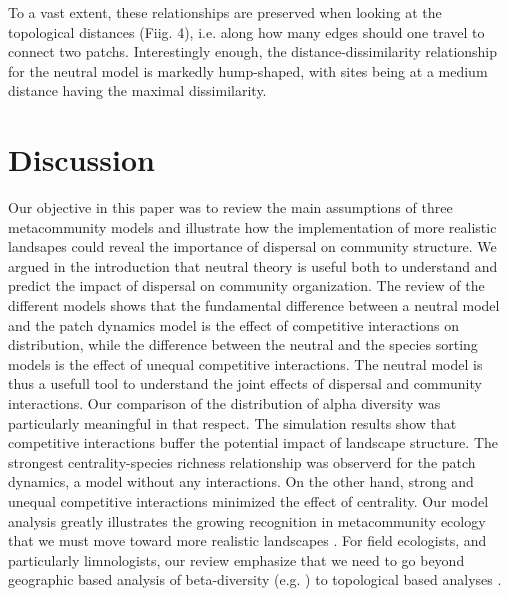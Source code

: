 \documentclass[12pt]{article}
\begin{document}
To a vast extent, these relationships are preserved when looking at the
topological distances (Fiig. 4), i.e. along how many edges should one travel to
connect two patchs. Interestingly enough, the distance-dissimilarity
relationship for the neutral model is markedly hump-shaped, with sites being at
a medium distance having the maximal dissimilarity.

\section{Discussion}

Our objective in this paper was to review the main assumptions of three
metacommunity models and illustrate how the implementation of more realistic
landsapes could reveal the importance of dispersal on community structure. We
argued in the introduction that neutral theory is useful both to understand and
predict the impact of dispersal on community organization. The review of the
different models shows that the fundamental difference between a neutral model
and the patch dynamics model is the effect of competitive interactions on
distribution, while the difference between the neutral and the species sorting
models is the effect of unequal competitive interactions. The neutral model is
thus a usefull tool to understand the joint effects of dispersal and community
interactions. Our comparison of the distribution of alpha diversity was
particularly meaningful in that respect. The simulation results show that
competitive interactions buffer the potential impact of landscape structure. The
strongest centrality-species richness relationship was observerd for the patch
dynamics, a model without any interactions. On the other hand, strong and
unequal competitive interactions minimized the effect of centrality. Our model
analysis greatly illustrates the growing recognition in metacommunity ecology
that we must move toward more realistic landscapes \parencite{Gilarranz2012}.
For field ecologists, and particularly limnologists, our review emphasize that
we need to go beyond geographic based analysis of beta-diversity (e.g.
\parencite{Legendre2005}) to topological based analyses \parencite{Peterson2013}.
\end{document}
